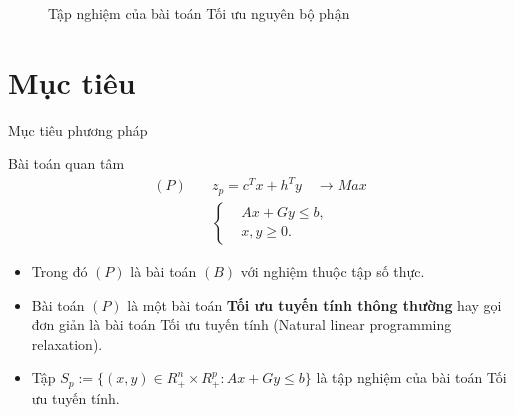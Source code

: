 \documentclass{beamer}
\begin{document}
\begin{frame}
\begin{center}
\begin{figure}
\caption{Tập nghiệm của bài toán Tối ưu nguyên bộ phận}
\end{figure}
\end{center}      
\end{frame}
    
\section{Mục tiêu}

\begin{frame}
   \center
   \huge Mục tiêu phương pháp
\end{frame}

\begin{frame}{Bài toán quan tâm}
\begin{equation}\label{P}
\begin{split}
(P) \quad & z_p=c^Tx+h^Ty \quad \longrightarrow Max \\
            & \left\{\begin{split}
                &Ax+Gy \leq  b, \\
                &x,y \geq 0.
            \end{split}\right.    
\end{split}
\end{equation}
\begin{itemize}
\item Trong đó $(P)$ là bài toán $(B)$ với nghiệm thuộc tập số thực.
\item Bài toán $(P)$ là một bài toán \textbf{Tối ưu tuyến tính thông thường} hay gọi đơn giản là bài toán Tối ưu tuyến tính (Natural linear programming relaxation).
\item Tập $S_p:=\{(x,y)\in R^n_+\times R^p_+: Ax+Gy\leq b\}$ là tập nghiệm của bài toán Tối ưu tuyến tính.
\end{itemize}
\end{frame}
\end{document}
